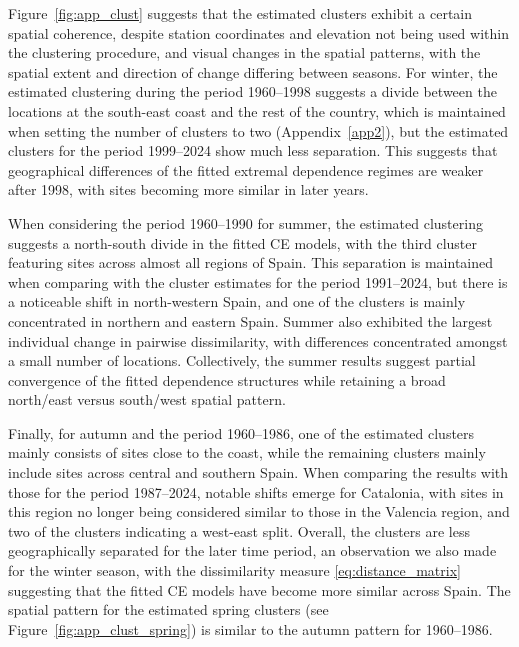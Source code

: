 \documentclass[APA,STIX1COL]{WileyNJD-v2}
\begin{document}
Figure~\ref{fig:app_clust} suggests that the estimated clusters exhibit a certain spatial coherence, despite station coordinates and elevation not being used within the clustering procedure, and visual changes in the spatial patterns, with the spatial extent and direction of change differing between seasons. For winter, the estimated clustering during the period 1960--1998 suggests a divide between the locations at the south-east coast and the rest of the country, which is maintained when setting the number of clusters to two (Appendix~\ref{app2}), but the estimated clusters for the period 1999--2024 show much less separation. This suggests that geographical differences of the fitted extremal dependence regimes are weaker after 1998, with sites becoming more similar in later years. 

When considering the period 1960--1990 for summer, the estimated clustering suggests a north-south divide in the fitted CE models, with the third cluster featuring sites across almost all regions of Spain. 
This separation is maintained when comparing with the cluster estimates for the period 1991--2024, but there is a noticeable shift in north-western Spain, and one of the clusters is mainly concentrated in northern and eastern Spain. 
Summer also exhibited the largest individual change in pairwise dissimilarity, with differences concentrated amongst a small number of locations. 
Collectively, the summer results suggest partial convergence of the fitted dependence structures while retaining a broad north/east versus south/west spatial pattern.

Finally, for autumn and the period 1960--1986, one of the estimated clusters mainly consists of sites close to the coast, while the remaining clusters mainly include sites across central and southern Spain. 
When comparing the results with those for the period 1987--2024, notable shifts emerge for Catalonia, with sites in this region no longer being considered similar to those in the Valencia region, and two of the clusters indicating a west-east split. Overall, the clusters are less geographically separated for the later time period, an observation we also made for the winter season, with the dissimilarity measure \eqref{eq:distance_matrix} suggesting that the fitted CE models have become more similar across Spain. 
The spatial pattern for the estimated spring clusters (see Figure~\ref{fig:app_clust_spring})  is similar to the autumn pattern for 1960--1986.
\end{document}

